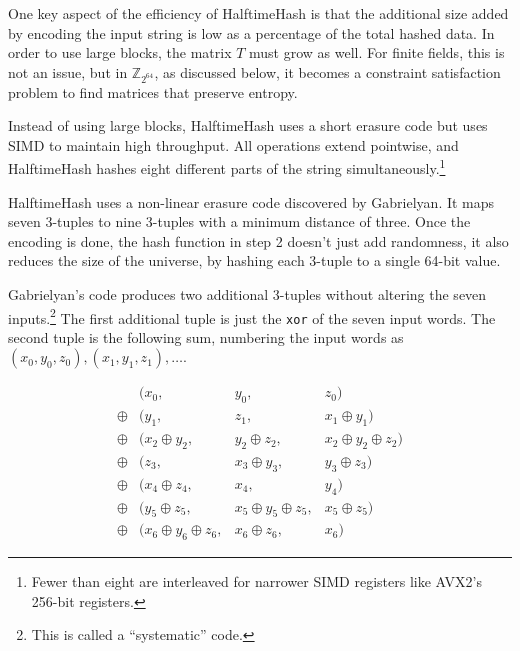 \documentclass[sigconf, nonacm]{acmart}
\newcommand{\ints}{\mathbb{Z}}
\begin{document}
One key aspect of the efficiency of HalftimeHash is that the additional size added by encoding the input string is low as a percentage of the total hashed data.
In order to use large blocks, the matrix $T$ must grow as well.
For finite fields, this is not an issue, but in $\ints_{2^{64}}$, as discussed below, it becomes a constraint satisfaction problem to find matrices that preserve entropy.

Instead of using large blocks, HalftimeHash uses a short erasure code but uses SIMD to maintain high throughput.
All operations extend pointwise, and HalftimeHash hashes eight different parts of the string simultaneously.\footnote{Fewer than eight are interleaved for narrower SIMD registers like AVX2's 256-bit registers.}

HalftimeHash uses a non-linear erasure code discovered by Gab\-ri\-el\-yan. \cite{9-7-erasure-code}
It maps seven 3-tuples to nine 3-tuples with a minimum distance of three.
Once the encoding is done, the hash function in step 2 doesn't just add randomness, it also reduces the size of the universe, by hashing each 3-tuple to a single 64-bit value.

Gabrielyan's code produces two additional 3-tuples without altering the seven inputs.\footnote{This is called a ``systematic'' code.}
The first additional tuple is just the \texttt{xor} of the seven input words.
The second tuple is the following sum, numbering the input words as $(x_0, y_0, z_0), (x_1, y_1, z_1), \dots$.

\begin{displaymath}
  \begin{array}{rlcr}
       & (x_0, & y_0, & z_0)\\
\oplus & (y_1,  & z_1,  & x_1 \oplus{} y_1) \\
\oplus & (x_2 \oplus{} y_2,& y_2 \oplus{} z_2,& x_2 \oplus{} y_2 \oplus{} z_2)\\
\oplus & (z_3,    &x_3 \oplus{} y_3,& y_3 \oplus{} z_3) \\
\oplus & (x_4 \oplus{} z_4,& x_4,& y_4)\\
\oplus & (y_5 \oplus{} z_5,& x_5 \oplus{} y_5 \oplus{} z_5,& x_5\oplus{}z_5)\\
\oplus & (x_6 \oplus{} y_6 \oplus{} z_6,& x_6 \oplus{} z_6,& x_6)
  \end{array}
\end{displaymath}
\end{document}
